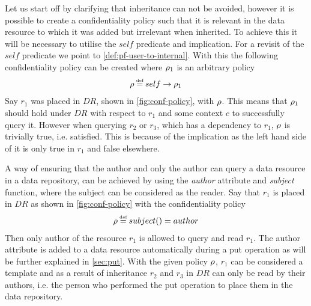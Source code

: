 \begin{example}
Let us start off by clarifying that inheritance can not be avoided, however it is possible to create a confidentiality policy such that it is relevant in the data resource to which it was added but irrelevant when inherited. To achieve this it will be necessary to utilise the $self$ predicate and implication. For a revisit of the $self$ predicate we point to \autoref{def:pf-user-to-internal}. With this the following confidentiality policy can be created where $\rho_1$ is an arbitrary policy 
\begin{align*}
    \conf \eqdef self \imply \conf_1
\end{align*}
Say $r_1$ was placed in $DR$, shown in \autoref{fig:conf-policy}, with $\rho$. This means that $\rho_1$ should hold under $DR$ with respect to $r_1$ and some context $c$ to successfully query it. However when querying $r_2$ or $r_3$, which has a dependency to $r_1$, $\rho$ is trivially true, i.e. satisfied. This is because of the implication as the left hand side of it is only true in $r_1$ and false elsewhere.
\end{example}

\begin{example}\label{ex:conf-reader-author}
A way of ensuring that the author and only the author can query a data resource in a data repository, can be achieved by using the \emph{author} attribute and \emph{subject} function, where the subject can be considered as the reader. Say that $r_1$ is placed in $DR$ as shown in \autoref{fig:conf-policy} with the confidentiality policy 
\begin{align*}
    \conf \eqdef subject() = author
\end{align*}
Then only author of the resource $r_1$ is allowed to query and read $r_1$. The author attribute is added to a data resource automatically during a put operation as will be further explained in \autoref{sec:put}. With the given policy $\rho$, $r_1$ can be considered a template and as a result of inheritance $r_2$ and $r_3$ in $DR$ can only be read by their authors, i.e. the person who performed the put operation to place them in the data repository.
\end{example}

